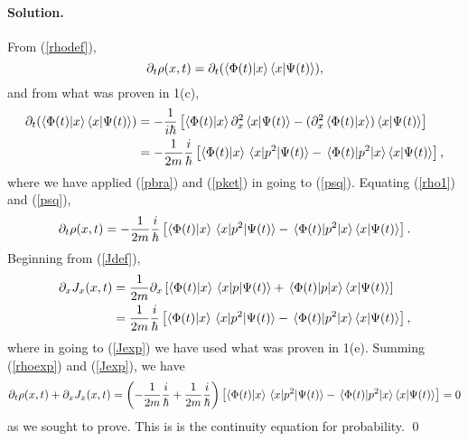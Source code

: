 \documentclass[11pt]{article}
\newcommand{\refeq}[1]{(\ref{#1})}
\newenvironment{solution}
{
    \paragraph{Solution.}
    \ignorespaces
}
{
}
\begin{document}
\begin{solution}
	From \refeq{rhodef},
	\begin{equation} \label{rho1}
		\partial_t \rho(x, t) = \partial_t (\braket{\Phi(t)}{x} \braket{x}{\Psi(t)}),
	\end{equation}
	and from what was proven in 1(c),
	\begin{align} 
		\partial_t ( \braket{\Phi(t)}{x} \braket{x}{\Psi(t)}) &= -\frac{1}{i \hbar} \left[ \braket{\Phi(t)}{x} \partial_x^2 \braket{x}{\Psi(t)} - (\partial_x^2 \braket{\Phi(t)}{x}) \braket{x}{\Psi(t)} \right] \\
		&= -\frac{1}{2m} \frac{i}{\hbar} \left[ \braket{\Phi(t)}{x} \mel{x}{p^2}{\Psi(t)} - \mel{\Phi(t)}{p^2}{x} \braket{x}{\Psi(t)} \right], \label{psq}
	\end{align}
	where we have applied \refeq{pbra} and \refeq{pket} in going to \refeq{psq}.  Equating \refeq{rho1} and \refeq{psq},
	\begin{equation} \label{rhoexp}
		\partial_t \rho(x, t) = -\frac{1}{2m} \frac{i}{\hbar} \left[ \braket{\Phi(t)}{x} \mel{x}{p^2}{\Psi(t)} - \mel{\Phi(t)}{p^2}{x} \braket{x}{\Psi(t)} \right].
	\end{equation}
	Beginning from \refeq{Jdef},
	\begin{align}
		\partial_x J_x(x, t) &= \frac{1}{2m} \partial_x \left[ \braket{\Phi(t)}{x} \mel{x}{p}{\Psi(t)} + \mel{\Phi(t)}{p}{x} \braket{x}{\Psi(t)} \right] \\
		&= \frac{1}{2m} \frac{i}{\hbar} \left[ \braket{\Phi(t)}{x} \mel{x}{p^2}{\Psi(t)} - \mel{\Phi(t)}{p^2}{x} \braket{x}{\Psi(t)} \right] \label{Jexp},
	\end{align}
	where in going to \refeq{Jexp} we have used what was proven in 1(e).  Summing \refeq{rhoexp} and \refeq{Jexp}, we have
	\begin{equation}
		\partial_t \rho(x, t) + \partial_x J_x(x, t) = \left(-\frac{1}{2m} \frac{i}{\hbar} + \frac{1}{2m} \frac{i}{\hbar} \right) \left[ \braket{\Phi(t)}{x} \mel{x}{p^2}{\Psi(t)} - \mel{\Phi(t)}{p^2}{x} \braket{x}{\Psi(t)} \right] = 0
	\end{equation}
	as we sought to prove.  This is is the continuity equation for probability. \qed
\end{solution}

\newcommand{\Le}{L_3}
\newcommand{\Lz}{L_z}
\newcommand{\Py}{P_y}
\newcommand{\Px}{P_x}

\newcommand{\lei}{l_{3,i}}
\newcommand{\klei}{\ket{\lei}}

\newcommand{\Ud}{U^\dagger}
\newcommand{\Uii}{U_{ii}}

\newcommand{\Xpm}{X_\pm}
\newcommand{\Xp}{X_+}
\newcommand{\Xm}{X_-}
\newcommand{\Ypm}{Y_\pm}

\newcommand{\Cpm}{C_\pm}
\end{document}
